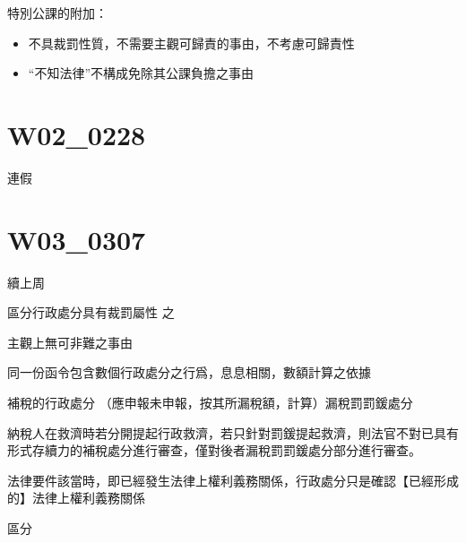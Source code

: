 \documentclass[]{ctexbook}
\providecommand{\tightlist}{%
  \setlength{\itemsep}{0pt}\setlength{\parskip}{0pt}}
\begin{document}
特別公課的附加：

\begin{itemize}
\tightlist
\item
  不具裁罰性質，不需要主觀可歸責的事由，不考慮可歸責性
\item
  ``不知法律''不構成免除其公課負擔之事由
\end{itemize}

\hypertarget{w02_0228}{%
\chapter{W02\_0228}\label{w02_0228}}

連假

\hypertarget{w03_0307}{%
\chapter{W03\_0307}\label{w03_0307}}

續上周

區分行政處分具有裁罰屬性 之

主觀上無可非難之事由

同一份函令包含數個行政處分之行爲，息息相關，數額計算之依據

補稅的行政處分
（應申報未申報，按其所漏稅額，計算）漏稅罰罰鍰處分

納稅人在救濟時若分開提起行政救濟，若只針對罰鍰提起救濟，則法官不對已具有形式存續力的補稅處分進行審查，僅對後者漏稅罰罰鍰處分部分進行審查。

法律要件該當時，即已經發生法律上權利義務關係，行政處分只是確認【已經形成的】法律上權利義務關係

區分
\end{document}
